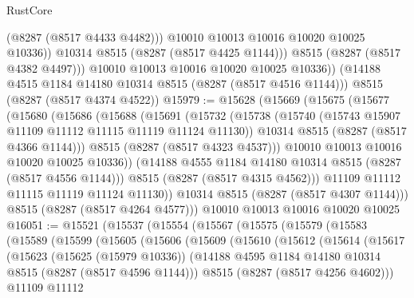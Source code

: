 \begin{lexlean}{RustCore}
\begin{coremodule}
                  (@8287 (@8517 @4433 @4482)))
                @10010
                @10013
                @10016
                @10020
                @10025
                @10336))
            @10314
            @8515
            (@8287 (@8517 @4425 @1144)))
          @8515
          (@8287 (@8517 @4382 @4497)))
        @10010
        @10013
        @10016
        @10020
        @10025
        @10336))
    (@14188 @4515 @1184 @14180 @10314 @8515 (@8287 (@8517 @4516 @1144)))
    @8515
    (@8287 (@8517 @4374 @4522))
@15979 := @15628
    (@15669
      (@15675
        (@15677
          (@15680
            (@15686
              (@15688
                (@15691
                  (@15732
                    (@15738
                      (@15740 (@15743 @15907 @11109 @11112 @11115 @11119 @11124 @11130))
                      @10314
                      @8515
                      (@8287 (@8517 @4366 @1144)))
                    @8515
                    (@8287 (@8517 @4323 @4537)))
                  @10010
                  @10013
                  @10016
                  @10020
                  @10025
                  @10336))
              (@14188 @4555 @1184 @14180 @10314 @8515 (@8287 (@8517 @4556 @1144)))
              @8515
              (@8287 (@8517 @4315 @4562)))
            @11109
            @11112
            @11115
            @11119
            @11124
            @11130))
        @10314
        @8515
        (@8287 (@8517 @4307 @1144)))
      @8515
      (@8287 (@8517 @4264 @4577)))
    @10010
    @10013
    @10016
    @10020
    @10025
@16051 := @15521
    (@15537
      (@15554
        (@15567
          (@15575
            (@15579
              (@15583
                (@15589
                  (@15599
                    (@15605
                      (@15606
                        (@15609
                          (@15610
                            (@15612
                              (@15614
                                (@15617
                                  (@15623
                                    (@15625 (@15979 @10336))
                                    (@14188
                                      @4595
                                      @1184
                                      @14180
                                      @10314
                                      @8515
                                      (@8287 (@8517 @4596 @1144)))
                                    @8515
                                    (@8287 (@8517 @4256 @4602)))
                                  @11109
                                  @11112

\end{coremodule}
\end{lexlean}
